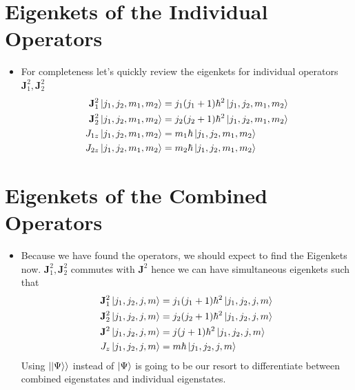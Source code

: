 \documentclass[10pt]{article}
\newcommand{\hb}{\hbar}
\renewcommand{\vec}{\mathbf}
\renewcommand{\vec}{\mathbf}
\begin{document}
\section*{Eigenkets of the Individual Operators}
\begin{itemize}
	\item For completeness let's quickly review the eigenkets for individual operators $\vec{J}_1^2, \vec{J}_2^2$ 
		\begin{align*}
		\vec{J}_1 ^2 \ket{j_1, j_2 , m_1 , m_2} &= j_1(j_1 + 1) \hb^2 \ket{j_1 , j_2 , m_1 , m_2} \\
		\vec{J}_2 ^2 \ket{j_1, j_2 , m_1 , m_2} &= j_2(j_2 + 1) \hb^2 \ket{j_1 , j_2 , m_1 , m_2} \\
		J_{1z} \ket{j_1, j_2 , m_1 , m_2 } &= m_1 \hb \ket{j_1, j_2 , m_1 , m_2 } \\
		J_{2z} \ket{j_1, j_2 , m_1 , m_2 } &= m_2 \hb \ket{j_1, j_2 , m_1 , m_2 } \\
		\end{align*}
\end{itemize}









	\section*{Eigenkets of the Combined Operators}
\begin{itemize}
\item Because we have found the operators, we should expect to find the Eigenkets now. $\vec{J}_1^2, \vec{J}_2^2$ commutes with $\vec{J}^2$ hence we can have simultaneous eigenkets such that 
	\begin{align}
		\vec{J}_1 ^2 \ket{j_1, j_2 , j , m} &= j_1(j_1 + 1) \hb^2 \ket{j_1 , j_2 , j , m} \\
		\vec{J}_2 ^2 \ket{j_1, j_2 , j , m} &= j_2(j_2 + 1) \hb^2 \ket{j_1 , j_2 , j , m} \\
		\vec{J} ^2 \ket{j_1, j_2 , j , m} &= j(j + 1) \hb^2 \ket{j_1 , j_2 , j , m} \\
		J_z  \ket{j_1, j_2 , j , m} &= m \hb \ket{j_1 , j_2 , j , m} 
	\end{align}
	Using $\ket{\ket{\Psi}}$ instead of $\ket{\Psi}$ is going to be our resort to differentiate between combined eigenstates and individual eigenstates.
\end{itemize}
\end{document}
